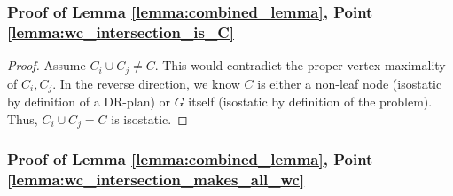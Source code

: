 







\subsubsection{Proof of Lemma \ref{lemma:combined_lemma}, Point \ref{lemma:wc_intersection_is_C}}

\begin{proof}
Assume $C_i\cup C_j \neq C$. This would contradict the proper vertex-maximality of $C_i,C_j$.
%
In the reverse direction, we know $C$ is either a non-leaf node (isostatic by definition of a DR-plan) or $G$ itself (isostatic by definition of the problem). Thus, $C_i\cup C_j=C$ is isostatic.
\end{proof}


\subsubsection{Proof of Lemma \ref{lemma:combined_lemma}, Point \ref{lemma:wc_intersection_makes_all_wc}}

